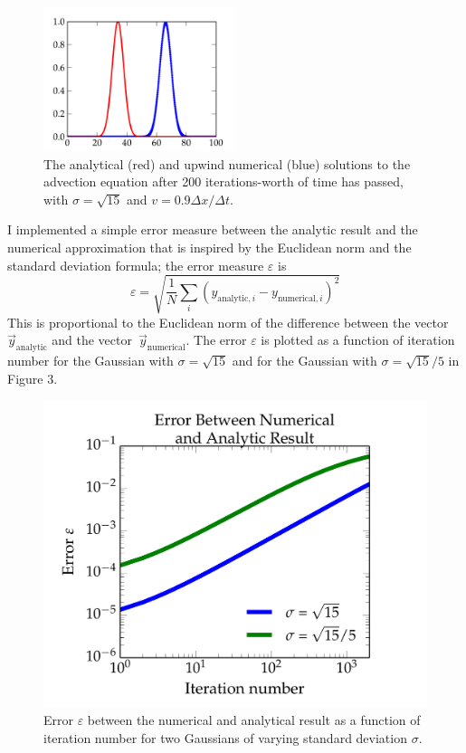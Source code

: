 \documentclass{article}
\begin{document}
\begin{spacing}{1.1}
\begin{figure}[H]
 \centering
 \hspace{0cm} \includegraphics[width=0.5\textwidth]{fig-v-0pt9.pdf}
 \caption{The analytical (red) and upwind numerical (blue) solutions to the advection equation after 200 iterations-worth of time has passed, with \(\sigma = \sqrt{15}\) and \(v = 0.9 \Delta x / \Delta t\).}
 \label{fig-v-0pt9}
\end{figure} 

I implemented a simple error measure between the analytic result and the numerical approximation that is inspired by the Euclidean norm and the standard deviation formula; the error measure \(\varepsilon\) is
\[
\varepsilon = \sqrt{\frac{1}{N}\sum_i (y_{\text{analytic}, i} - y_{\text{numerical}, i})^2}
\]
This is proportional to the Euclidean norm of the difference between the vector \(\vec{y}_\text{analytic}\) and the vector~\(\vec{y}_\text{numerical}\). The error \(\varepsilon\) is plotted as a function of iteration number for the Gaussian with \(\sigma = \sqrt{15}\) and for the Gaussian with \(\sigma = \sqrt{15}/5\) in Figure 3.

\begin{figure}[H]
 \centering
 \hspace{0cm} \includegraphics[width=\textwidth]{fig-errors.pdf}
 \caption{Error \(\varepsilon\) between the numerical and analytical result as a function of iteration number for two Gaussians of varying standard deviation \(\sigma\).}
 \label{fig-errors}
\end{figure} 


\end{spacing}
\end{document}
